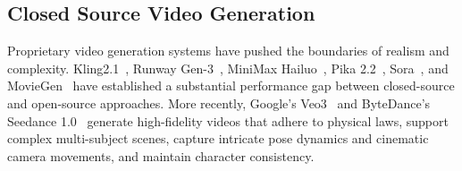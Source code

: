 
\subsection{Closed Source Video Generation}
\label{sec:arch-closed}
Proprietary video generation systems have pushed the boundaries of realism and complexity. Kling2.1~\cite{kling2p1}, Runway Gen-3~\cite{runwaygen3}, MiniMax Hailuo~\cite{hailuo2025}, Pika 2.2~\cite{pika1p5}, Sora~\cite{openai2024sora}, and MovieGen~\cite{polyak2024moviegen} have established a substantial performance gap between closed-source and open-source approaches. More recently, Google’s Veo3~\cite{deepmind2025veo3} and ByteDance’s Seedance 1.0~\cite{gao2025seedance} generate high-fidelity videos that adhere to physical laws, support complex multi-subject scenes, capture intricate pose dynamics and cinematic camera movements, and maintain character consistency. 
